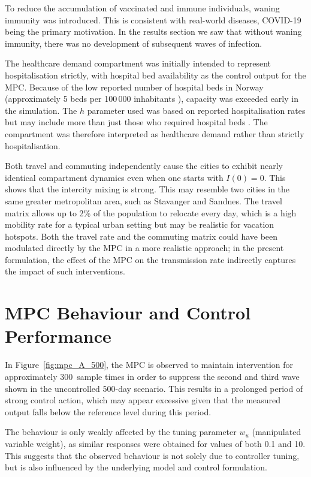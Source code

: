 To reduce the accumulation of vaccinated and immune individuals, waning immunity was introduced.
This is consistent with real-world diseases, COVID-19 being the primary motivation.
In the results section we saw that without waning immunity, there was no development of subsequent waves of infection.

The healthcare demand compartment was initially intended to represent hospitalisation strictly, with hospital bed availability as the control output for the MPC.
Because of the low reported number of hospital beds in Norway (approximately 5 beds per 100\,000 inhabitants \citep{kohler2021}), capacity was exceeded early in the simulation.
The $h$ parameter used was based on reported hospitalisation rates but may include more than just those who required hospital beds \citep{ariyaratne2025}.
The compartment was therefore interpreted as healthcare demand rather than strictly hospitalisation.

Both travel and commuting independently cause the cities to exhibit nearly identical compartment dynamics even when one starts with $I(0) = 0$.
This shows that the intercity mixing is strong.
This may resemble two cities in the same greater metropolitan area, such as Stavanger and Sandnes.
The travel matrix allows up to 2\% of the population to relocate every day, which is a high mobility rate for a typical urban setting but may be realistic for vacation hotspots.
Both the travel rate and the commuting matrix could have been modulated directly by the MPC in a more realistic approach; in the present formulation, the effect of the MPC on the transmission rate indirectly captures the impact of such interventions.

\section{MPC Behaviour and Control Performance}
\label{sec:disc_mpc}

In Figure~\ref{fig:mpc_A_500}, the MPC is observed to maintain intervention for approximately 300~sample times in order to suppress the second and third wave shown in the uncontrolled 500-day scenario.
This results in a prolonged period of strong control action, which may appear excessive given that the measured output falls below the reference level during this period.

The behaviour is only weakly affected by the tuning parameter $w_u$ (manipulated variable weight), as similar responses were obtained for values of both 0.1 and 10.
This suggests that the observed behaviour is not solely due to controller tuning, but is also influenced by the underlying model and control formulation.

